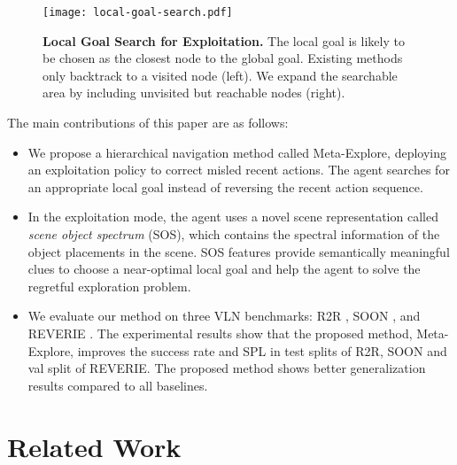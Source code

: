 \documentclass[10pt,twocolumn,letterpaper]{article}
\begin{document}
\begin{figure}[t!]{\centering\texttt{[image: local-goal-search.pdf]}}\centering
\caption{\protect\renewcommand{\baselinestretch}{0.9}\protect\small{\protect\textbf{Local Goal Search for Exploitation.} 
The local goal is likely to be chosen as the closest node to the global goal. Existing methods only backtrack to a visited node (left). We expand the searchable area by including unvisited but reachable nodes (right).
}} \label{fig:local-goal-search}\vspace{-0.5cm}
\end{figure}
The main contributions of this paper are as follows:
\begin{itemize}

    \item We propose a hierarchical navigation method called Meta-Explore, deploying an exploitation policy to correct misled recent actions. The agent searches for an appropriate local goal instead of reversing the recent action sequence.
    \vspace{-0.2cm}
    \item In the exploitation mode, the agent uses a novel scene representation called \textit{scene object spectrum} (SOS), which contains the spectral information of the object placements in the scene. SOS features provide semantically meaningful clues to choose a near-optimal local goal and help the agent to solve the regretful exploration problem.
    \vspace{-0.2cm}
    \item We evaluate our method on three VLN benchmarks: R2R \cite{anderson2018vision}, SOON \cite{zhu2021soon}, and REVERIE \cite{qi2020reverie}. 
    The experimental results show that the proposed method, Meta-Explore, improves the success rate and SPL in test splits of R2R, SOON and val split of REVERIE. 
    The proposed method shows better generalization results compared to all baselines.
\end{itemize}

\vspace{-0.45cm}
\section{Related Work}
\vspace{-0.15cm}
\end{document}
